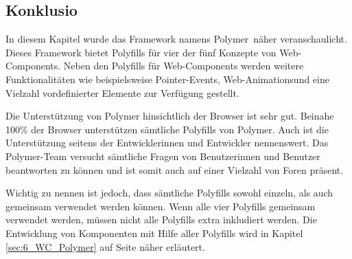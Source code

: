 \subsection{Konklusio}
\label{sec:4_Konklusion}

In diesem Kapitel wurde das Framework namens \glqq Polymer\grqq\ näher veranschaulicht. Dieses Framework bietet Polyfills für vier der fünf Konzepte von \glqq Web-Components\grqq . Neben den Polyfills für Web-Components werden weitere Funktionalitäten wie beispielsweise \glqq Pointer-Events\grqq , \glqq Web-Animations\grqq und eine Vielzahl vordefinierter Elemente zur Verfügung gestellt.

Die Unterstützung von Polymer hinsichtlich der Browser ist sehr gut. Beinahe 100\% der Browser unterstützen sämtliche Polyfills von Polymer. Auch ist die Unterstützung seitens der Entwicklerinnen und Entwickler nennenswert. Das Polymer-Team versucht sämtliche Fragen von Benutzerinnen und Benutzer beantworten zu können und ist somit auch auf einer Vielzahl von Foren präsent.

Wichtig zu nennen ist jedoch, dass sämtliche Polyfills sowohl einzeln, als auch gemeinsam verwendet werden können. Wenn alle vier Polyfills gemeinsam verwendet werden, müssen nicht alle Polyfills extra inkludiert werden. Die Entwicklung von Komponenten mit Hilfe aller Polyfills wird in Kapitel \ref{sec:6_WC_Polymer} auf Seite \pageref{sec:6_WC_Polymer} näher erläutert.
